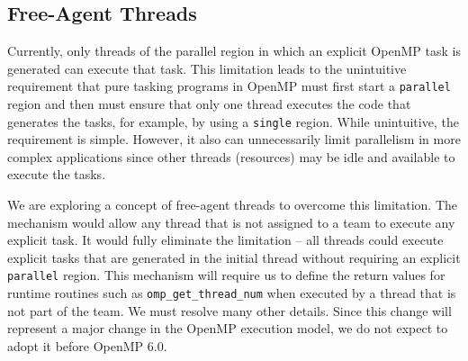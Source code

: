 \subsection{Free-Agent Threads}
\label{sub:task_only_threads}


Currently, only threads of the parallel region in which an explicit
OpenMP task is generated can execute that task. This limitation leads
to the unintuitive requirement that pure tasking programs in OpenMP
must first start a \texttt{parallel} region and then must ensure that 
only one thread executes the code that generates the tasks, for example, 
by using a \texttt{single} region. While unintuitive, the requirement is
simple. However, it also can unnecessarily limit parallelism in more
complex applications since other threads (resources) may be idle and 
available to execute the tasks.

We are exploring a concept of free-agent threads to overcome this 
limitation. The mechanism would allow any thread that is not assigned
to a team to execute any explicit task. It would fully eliminate the
limitation -- all threads could execute explicit tasks that are 
generated in the initial thread without requiring an explicit 
\texttt{parallel} region. This mechanism will require us to define 
the return values for runtime routines such as \texttt{omp\_get\_thread\_num}
when executed by a thread that is not part of the team. We must resolve
many other details. Since this change will represent a major change in 
the OpenMP execution model, we do not expect to adopt it before OpenMP 6.0.




